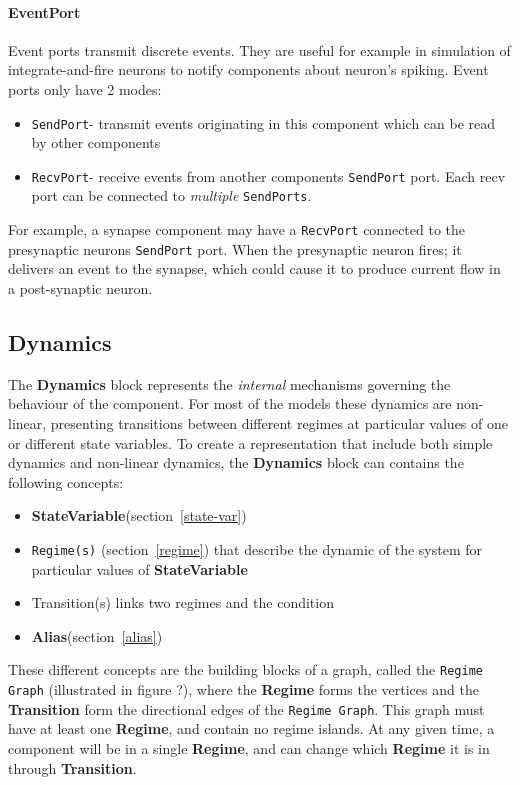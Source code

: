 \documentclass{article}
\newcommand{\Dynamics}{{\bf{Dynamics}}\xspace}
\newcommand{\StateVariable}{{\bf{StateVariable}}\xspace}
\newcommand{\Alias}{{\bf{Alias}}\xspace}
\newcommand{\Regime}{{\bf{Regime}}\xspace}
\newcommand{\Transition}{{\bf{Transition}}\xspace}
\newcommand{\SendPort}{{\tt{SendPort}}\xspace}
\newcommand{\RecvPort}{{\tt{RecvPort}}\xspace}
\newcommand{\SendPorts}{{\tt{SendPorts}}\xspace}
\begin{document}
\paragraph{EventPort}

\label{eventPorts}

Event ports transmit discrete events. They are useful for example in
simulation of integrate-and-fire neurons to notify components about neuron's
spiking. Event ports only have 2 modes:

\begin{itemize}
\item \SendPort - transmit events originating in this component which can be read by
other components
\item \RecvPort - receive events from another components \SendPort port.
Each recv port can be connected to \emph{multiple} \SendPorts.
\end{itemize}

For example, a synapse component may have a \RecvPort connected to the
presynaptic neurons \SendPort port. When the presynaptic neuron fires;
it delivers an event to the synapse, which could cause it to produce current
flow in a post-synaptic neuron.

\subsection{Dynamics}

The \Dynamics block represents the \emph{internal} mechanisms governing the behaviour
of the component. 
For most of the models these dynamics are non-linear, presenting transitions between different regimes at particular values of one or different state variables.
To create a representation that include both simple dynamics and non-linear dynamics, the \Dynamics block can contains the following concepts:

\begin{itemize}
\item \StateVariable (section~\ref{state-var})
\item {\tt Regime(s)} (section~\ref{regime}) that describe the dynamic of the system for particular values of \StateVariable 
\item Transition(s) links two regimes and the condition
\item \Alias (section~\ref{alias})
\end{itemize}

These different concepts are the building blocks of a graph, called the {\tt Regime Graph} (illustrated in figure ?), where the \Regime forms the vertices and the \Transition form the directional edges of the {\tt Regime Graph}.
This graph must have at least one \Regime, and contain no regime islands.  At any given time, a
component will be in a single \Regime, and can change which \Regime it is in through \Transition.
\end{document}
